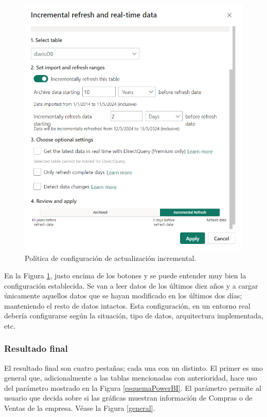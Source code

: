 \begin{figure}[H]
    \centering
    \includegraphics[scale = 0.6]{imgs/refresh_policy.png}
    \caption{Política de configuración de actualización incremental.}
    \label{refreshPolicy}
\end{figure}

En la Figura \ref{refreshPolicy}, justo encima de los botones  y  se puede entender muy bien la configuración establecida. Se van a leer datos de los últimos diez años y a cargar únicamente aquellos datos que se hayan modificado en los últimos dos días; manteniendo el resto de datos intactos. Esta configuración, en un entorno real debería configurarse según la situación, tipo de datos, arquitectura implementada, etc.

\subsubsection{Resultado final}

\label{resFinal}
El resultado final son cuatro pestañas; cada una con un  distinto. El primer  es uno general que, adicionalmente a las tablas mencionadas con anterioridad, hace uso del parámetro  mostrado en la Figura \ref{esquemaPowerBI}. El parámetro  permite al usuario que decida sobre si las gráficas muestran información de Compras o de Ventas de la empresa. Véase la Figura \ref{general}.

